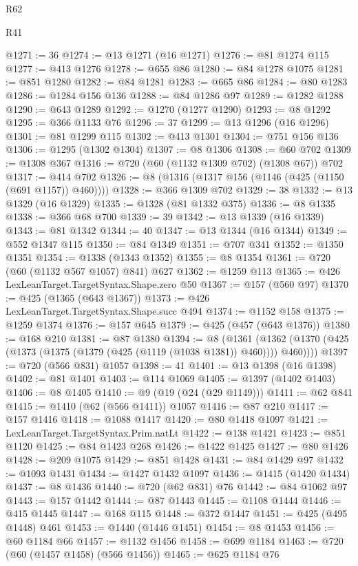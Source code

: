 \begin{lexlean}{R62}
\begin{lexlean}{R41}
\begin{coremodule}
{{{{{{{{{{{{{{{{{{{{{{{{{{{{{{{{{{{{{{{{{{{{{{{{{{{{{{{{{{{{{{{{{{{{{{{{{{{{{{{{{{{{{{{@1271 := 36
@1274 := @13 @1271 (@16 @1271)
@1276 := @81 @1274 @115
@1277 := @413 @1276
@1278 := @655 @86
@1280 := @84 @1278 @1075
@1281 := @851 @1280
@1282 := @84 @1281
@1283 := @665 @86
@1284 := @80 @1283
@1286 := @1284 @156 @136
@1288 := @84 @1286 @97
@1289 := @1282 @1288
@1290 := @643 @1289
@1292 := @1270 (@1277 @1290)
@1293 := @8 @1292
@1295 := @366 @1133 @76
@1296 := 37
@1299 := @13 @1296 (@16 @1296)
@1301 := @81 @1299 @115
@1302 := @413 @1301
@1304 := @751 @156 @136
@1306 := @1295 (@1302 @1304)
@1307 := @8 @1306
@1308 := @60 @702
@1309 := @1308 @367
@1316 := @720 (@60 (@1132 @1309 @702) (@1308 @67)) @702
@1317 := @414 @702
@1326 := @8 (@1316 (@1317 @156 (@1146 (@425 (@1150 (@691 @1157)) @460))))
@1328 := @366 @1309 @702
@1329 := 38
@1332 := @13 @1329 (@16 @1329)
@1335 := @1328 (@81 @1332 @375)
@1336 := @8 @1335
@1338 := @366 @68 @700
@1339 := 39
@1342 := @13 @1339 (@16 @1339)
@1343 := @81 @1342
@1344 := 40
@1347 := @13 @1344 (@16 @1344)
@1349 := @552 @1347 @115
@1350 := @84 @1349
@1351 := @707 @341
@1352 := @1350 @1351
@1354 := @1338 (@1343 @1352)
@1355 := @8 @1354
@1361 := @720 (@60 (@1132 @567 @1057) @841) @627
@1362 := @1259 @113
@1365 := @426 LexLeanTarget.TargetSyntax.Shape.zero @50
@1367 := @157 (@560 @97)
@1370 := @425 (@1365 (@643 @1367))
@1373 := @426 LexLeanTarget.TargetSyntax.Shape.succ @494
@1374 := @1152 @158
@1375 := @1259 @1374
@1376 := @157 @645
@1379 := @425 (@457 (@643 @1376))
@1380 := @168 @210
@1381 := @87 @1380
@1394 := @8
    (@1361 (@1362 (@1370 (@425 (@1373 (@1375 (@1379 (@425 (@1119 (@1038 @1381)) @460)))) @460))))
@1397 := @720 (@566 @831) @1057
@1398 := 41
@1401 := @13 @1398 (@16 @1398)
@1402 := @81 @1401
@1403 := @114 @1069
@1405 := @1397 (@1402 @1403)
@1406 := @8 @1405
@1410 := @9 (@19 (@24 (@29 @1149)))
@1411 := @62 @841
@1415 := @1410 (@62 (@566 @1411)) @1057
@1416 := @87 @210
@1417 := @157 @1416
@1418 := @1088 @1417
@1420 := @80 @1418 @1097
@1421 := LexLeanTarget.TargetSyntax.Prim.natLt
@1422 := @138 @1421
@1423 := @851 @1120
@1425 := @84 @1423 @268
@1426 := @1422 @1425
@1427 := @80 @1426
@1428 := @209 @1075
@1429 := @851 @1428
@1431 := @84 @1429 @97
@1432 := @1093 @1431
@1434 := @1427 @1432 @1097
@1436 := @1415 (@1420 @1434)
@1437 := @8 @1436
@1440 := @720 (@62 @831) @76
@1442 := @84 @1062 @97
@1443 := @157 @1442
@1444 := @87 @1443
@1445 := @1108 @1444
@1446 := @415 @1445
@1447 := @168 @115
@1448 := @372 @1447
@1451 := @425 (@495 @1448) @461
@1453 := @1440 (@1446 @1451)
@1454 := @8 @1453
@1456 := @60 @1184 @66
@1457 := @1132 @1456
@1458 := @699 @1184
@1463 := @720 (@60 (@1457 @1458) (@566 @1456))
@1465 := @625 @1184 @76
}}}}}}}}}}}}}}}}}}}}}}}}}}}}}}}}}}}}}}}}}}}}}}}}}}}}}}}}}}}}}}}}}}}}}}}}}}}}}}}}}}}}}}}
\end{coremodule}
\end{lexlean}
\end{lexlean}
